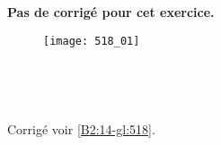 \normaltrue \difficilefalse \tdifficilefalse
\correctionfalse


\setcounter{numques}{0}
\ifcorrection
\else
\textbf{Pas de corrigé pour cet exercice.}
\fi

\ifprof
\else


\begin{figure}[H]
\centering
\texttt{[image: 518\_01]}
\end{figure}


\ifprof ~\\
\else
\fi

\ifprof ~\\
\else
\fi


\ifprof
\else
\begin{flushright}
\footnotesize{Corrigé  voir \ref{B2:14-gl:518}.}
\end{flushright}%
\fi